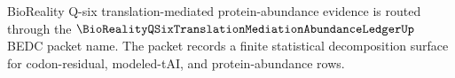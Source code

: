 BioReality Q-six translation-mediated protein-abundance evidence is routed through the $\BioRealityQSixTranslationMediationAbundanceLedgerUp$ BEDC packet name. The packet records a finite statistical decomposition surface for codon-residual, modeled-tAI, and protein-abundance rows.
